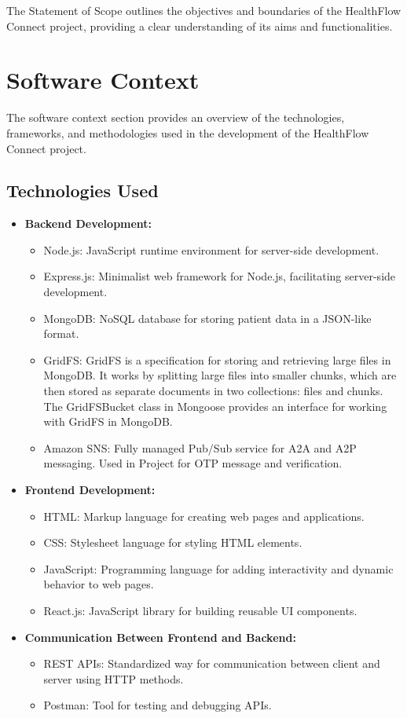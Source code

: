 The Statement of Scope outlines the objectives and boundaries of the HealthFlow Connect project, providing a clear understanding of its aims and functionalities.

\section{Software Context}

The software context section provides an overview of the technologies, frameworks, and methodologies used in the development of the HealthFlow Connect project.

\subsection{Technologies Used}

\begin{itemize}
  \item \textbf{Backend Development:}
  \begin{itemize}
    \item Node.js: JavaScript runtime environment for server-side development.
    \item Express.js: Minimalist web framework for Node.js, facilitating server-side development.
    \item MongoDB: NoSQL database for storing patient data in a JSON-like format.
    \item GridFS: GridFS is a specification for storing and retrieving large files in MongoDB. It works by splitting large files into smaller chunks, which are then stored as separate documents in two collections: files and chunks. The GridFSBucket class in Mongoose provides an interface for working with GridFS in MongoDB.
    \item Amazon SNS: Fully managed Pub/Sub service for A2A and A2P messaging. Used in Project for OTP message and verification.
  \end{itemize}
  
  \item \textbf{Frontend Development:}
  \begin{itemize}
    \item HTML: Markup language for creating web pages and applications.
    \item CSS: Stylesheet language for styling HTML elements.
    \item JavaScript: Programming language for adding interactivity and dynamic behavior to web pages.
    \item React.js: JavaScript library for building reusable UI components.
  \end{itemize}
  
  \item \textbf{Communication Between Frontend and Backend:}
  \begin{itemize}
    \item REST APIs: Standardized way for communication between client and server using HTTP methods.
    \item Postman: Tool for testing and debugging APIs.
  \end{itemize}
\end{itemize}

